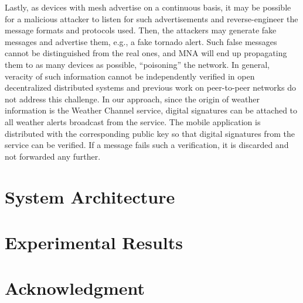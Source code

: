 \documentclass[conference]{IEEEtran}
\begin{document}
Lastly, as devices with mesh advertise on a continuous basis, it may be possible for a malicious attacker to listen for such advertisements and reverse-engineer the message formats and protocols used. Then, the attackers may generate fake messages and advertise them, e.g., a fake tornado alert. Such false messages cannot be distinguished from the real ones, and MNA will end up propagating them to as many devices as possible, ``poisoning'' the network. In general, veracity of such information cannot be independently verified in open decentralized distributed systems and previous work on peer-to-peer networks do not address this challenge. In our approach, since the origin of weather information is the Weather Channel service, digital signatures can be attached to all weather alerts broadcast from the service. The mobile application is distributed with the corresponding public key so that digital signatures from the service can be verified. If a message fails such a verification, it is discarded and not forwarded any further.

\section{System Architecture}

\section{Experimental Results}

\section*{Acknowledgment}



\end{document}
